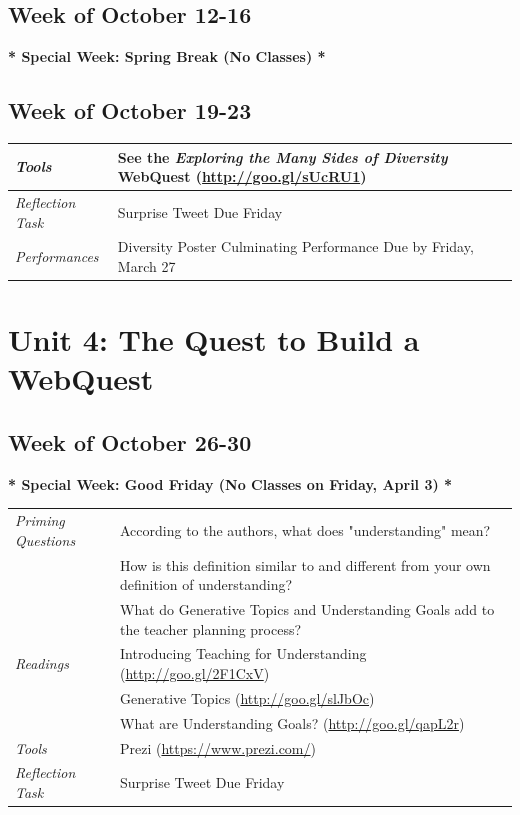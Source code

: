 \documentclass{tufte-handout}
\newcommand{\tabpq}{\faQuestionSign\medspace\textit{Priming Questions}}
\newcommand{\tabread}{\faBook\medspace\textit{Readings}}
\newcommand{\tabtools}{\faWrench\medspace\textit{Tools}}
\newcommand{\tabtweet}{\faLightbulb\medspace\textit{Reflection Task} & Surprise Tweet Due Friday \\}
\newcommand{\tabperformance}{\faTasks\medspace\textit{Performances}}
\newenvironment{tabsched}
	{\small
	\begin{tabular}{p{1.5in}p{5in}}
	\toprule}
	{\bottomrule
	\end{tabular}
	\normalsize}
\newcommand{\weeknine}{October 12-16}
\newcommand{\weekten}{October 19-23}
\newcommand{\weekeleven}{October 26-30}
\begin{document}
\begin{fullwidth}
\subsection{Week of \weeknine}

\begin{center}
	\textbf{* Special Week: Spring Break (No Classes) *}
\end{center}

\subsection{Week of \weekten}

\begin{tabsched}
	\tabtools & See the \textit{Exploring the Many Sides of Diversity} WebQuest (\url{http://goo.gl/sUcRU1}) \\
	\midrule
	\tabtweet
	\midrule
	\tabperformance & Diversity Poster Culminating Performance Due by Friday, March 27 \\
\end{tabsched}

\section{Unit 4: The Quest to Build a WebQuest}

\subsection{Week of \weekeleven}

\begin{center}
	\textbf{* Special Week: Good Friday (No Classes on Friday, April 3) *}
\end{center}

\begin{tabsched}
	\tabpq & According to the authors, what does "understanding" mean? \\
	& How is this definition similar to and different from your own definition of understanding? \\
	& What do Generative Topics and Understanding Goals add to the teacher planning process? \\
	\midrule
	\tabread & Introducing Teaching for Understanding (\url{http://goo.gl/2F1CxV}) \\
	& Generative Topics (\url{http://goo.gl/slJbOc}) \\
	& What are Understanding Goals? (\url{http://goo.gl/qapL2r}) \\
	\midrule
	\tabtools & Prezi (\url{https://www.prezi.com/}) \\
	\midrule
	\tabtweet
\end{tabsched}


\end{fullwidth}
\end{document}
